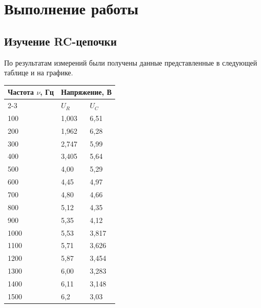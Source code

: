 \documentclass[14pt, a4paper, twoside]{extreport}
\begin{document}
\chapter{Выполнение работы}
\section{Изучение RC-цепочки}

По результатам измерений были получены данные представленные в следующей таблице и на графике.

\begin{table}[H]
  \centering
  \begin{tabular}{|l|ll|}
    \hline
    \multirow{2}{*}{\textbf{Частота $\nu$, Гц}} & \multicolumn{2}{l|}{\textbf{Напряжение, В}}           \\ \cline{2-3}
    & \multicolumn{1}{l|}{\textbf{$U_R$}} & \textbf{$U_C$} \\ \hline
    100                               & \multicolumn{1}{l|}{1,003}         & 6,51          \\ \hline
    200                               & \multicolumn{1}{l|}{1,962}         & 6,28          \\ \hline
    300                               & \multicolumn{1}{l|}{2,747}         & 5,99          \\ \hline
    400                               & \multicolumn{1}{l|}{3,405}         & 5,64          \\ \hline
    500                               & \multicolumn{1}{l|}{4,00}          & 5,29          \\ \hline
    600                               & \multicolumn{1}{l|}{4,45}          & 4,97          \\ \hline
    700                               & \multicolumn{1}{l|}{4,80}          & 4,66          \\ \hline
    800                               & \multicolumn{1}{l|}{5,12}          & 4,35          \\ \hline
    900                               & \multicolumn{1}{l|}{5,35}          & 4,12          \\ \hline
    1000                              & \multicolumn{1}{l|}{5,53}          & 3,817         \\ \hline
    1100                              & \multicolumn{1}{l|}{5,71}          & 3,626         \\ \hline
    1200                              & \multicolumn{1}{l|}{5,87}          & 3,454         \\ \hline
    1300                              & \multicolumn{1}{l|}{6,00}          & 3,283         \\ \hline
    1400                              & \multicolumn{1}{l|}{6,11}          & 3,148         \\ \hline
    1500                              & \multicolumn{1}{l|}{6,2}           & 3,03          \\ \hline
  \end{tabular}
\end{table}
\end{document}
